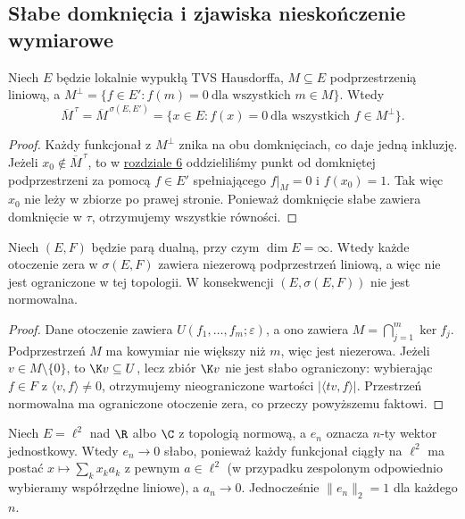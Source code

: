 \subsection{Słabe domknięcia i zjawiska nieskończenie wymiarowe}

\begin{twierdzenie}
\label{thm:anihilator-domkniecie}
Niech $E$ będzie lokalnie wypukłą TVS Hausdorffa,
$M\subseteq E$ podprzestrzenią liniową, a
$M^\perp=\{f\in E': f(m)=0\ \text{dla wszystkich }m\in M\}$.
Wtedy
\[
\overline M^{\,\tau}=\overline M^{\,\sigma(E,E')}
=\{x\in E:f(x)=0\ \text{dla wszystkich }f\in M^\perp\}.
\]
\end{twierdzenie}
\begin{proof}
Każdy funkcjonał z $M^\perp$ znika na obu domknięciach,
co daje jedną inkluzję. Jeżeli $x_0\notin\overline M^{\,\tau}$,
to w \hyperref[sec:hahn-banach]{rozdziale 6} oddzieliliśmy punkt od domkniętej
podprzestrzeni za pomocą $f\in E'$ spełniającego
$f|_M=0$ i $f(x_0)=1$. Tak więc $x_0$ nie leży w
zbiorze po prawej stronie. Ponieważ domknięcie słabe
zawiera domknięcie w $\tau$, otrzymujemy wszystkie równości.
\end{proof}

\begin{stwierdzenie}
\label{prop:slabe-otoczenia}
Niech $(E,F)$ będzie parą dualną, przy czym
$\dim E=\infty$. Wtedy każde otoczenie zera w
$\sigma(E,F)$ zawiera niezerową podprzestrzeń liniową,
a więc nie jest ograniczone w tej topologii.
W konsekwencji $(E,\sigma(E,F))$ nie jest normowalna.
\end{stwierdzenie}
\begin{proof}
Dane otoczenie zawiera $U(f_1,\ldots,f_m;\varepsilon)$,
a ono zawiera $M=\bigcap_{j=1}^m\ker f_j$.
Podprzestrzeń $M$ ma kowymiar nie większy niż $m$,
więc jest niezerowa. Jeżeli $v\in M\setminus\{0\}$,
to $\K v\subseteq U$, lecz zbiór $\K v$ nie jest
słabo ograniczony: wybierając $f\in F$ z
$\langle v,f\rangle\ne0$, otrzymujemy nieograniczone
wartości $|\langle tv,f\rangle|$.
Przestrzeń normowalna ma ograniczone otoczenie zera,
co przeczy powyższemu faktowi.
\end{proof}

\begin{przyklad}
Niech $E=\ell^2$ nad $\R$ albo $\C$ z topologią normową,
a $e_n$ oznacza $n$-ty wektor jednostkowy. Wtedy
$e_n\to0$ słabo, ponieważ każdy funkcjonał ciągły na
$\ell^2$ ma postać $x\mapsto\sum_k x_k a_k$
z pewnym $a\in\ell^2$ (w przypadku zespolonym
odpowiednio wybieramy współrzędne liniowe), a $a_n\to0$.
Jednocześnie $\|e_n\|_2=1$ dla każdego $n$.
\end{przyklad}

